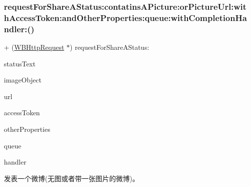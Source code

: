 \mbox{\label{interface_w_b_http_request_ad1a9992eb9534605e3b5d1100a2e693a}} 
\subsubsection{\texorpdfstring{request\+For\+Share\+A\+Status\+:contatins\+A\+Picture\+:or\+Picture\+Url\+:with\+Access\+Token\+:and\+Other\+Properties\+:queue\+:with\+Completion\+Handler\+:()}{requestForShareAStatus:contatinsAPicture:orPictureUrl:withAccessToken:andOtherProperties:queue:withCompletionHandler:()}\hspace{0.1cm}{\footnotesize\ttfamily [1/3]}}
{\footnotesize\ttfamily + (\mbox{\hyperlink{interface_w_b_http_request}{W\+B\+Http\+Request}} $\ast$) request\+For\+Share\+A\+Status\+: \begin{DoxyParamCaption}\item[{(N\+S\+String $\ast$)}]{status\+Text }\item[{contatinsAPicture:(\mbox{\hyperlink{interface_w_b_image_object}{W\+B\+Image\+Object}} $\ast$)}]{image\+Object }\item[{orPictureUrl:(N\+S\+String $\ast$)}]{url }\item[{withAccessToken:(N\+S\+String $\ast$)}]{access\+Token }\item[{andOtherProperties:(N\+S\+Dictionary $\ast$)}]{other\+Properties }\item[{queue:(N\+S\+Operation\+Queue $\ast$)}]{queue }\item[{withCompletionHandler:(W\+B\+Request\+Handler)}]{handler }\end{DoxyParamCaption}}

发表一个微博(无图或者带一张图片的微博)。


